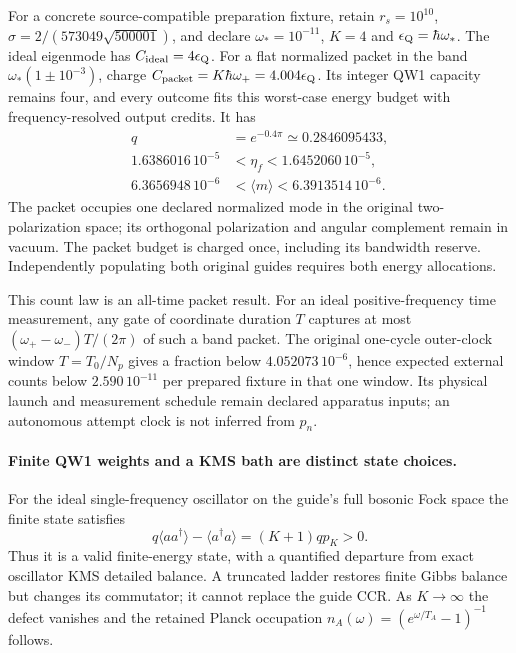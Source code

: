 \documentclass[10pt,twocolumn,letterpaper]{article}
\renewcommand{\hbar}{\mathchar'26\mkern-9mu h}
\begin{document}
For a concrete source-compatible preparation fixture, retain $r_s=10^{10}$,
$\sigma=2/(573049\sqrt{500001})$, and declare
$\omega_*=10^{-11}$, $K=4$ and $\epsilon_{\rm Q}=\hbar\omega_*$.
The ideal eigenmode has $C_{\rm ideal}=4\epsilon_{\rm Q}$.
For a flat normalized packet in the band $\omega_*(1\pm10^{-3})$,
charge $C_{\rm packet}=K\hbar\omega_+=4.004\epsilon_{\rm Q}$. Its
integer QW1 capacity remains four, and every outcome fits this worst-case
energy budget with frequency-resolved output credits. It has
\[
 \begin{split}
 q&=e^{-0.4\pi}\simeq0.2846095433,\\
 1.6386016\,10^{-5}&<\eta_f<1.6452060\,10^{-5},\\
 6.3656948\,10^{-6}&<\langle m\rangle<6.3913514\,10^{-6}.
 \end{split}
\]
The packet occupies one declared normalized mode in the original
two-polarization space; its orthogonal polarization and angular complement
remain in vacuum. The packet budget is charged once, including its bandwidth reserve. Independently populating
both original guides requires both energy allocations.

This count law is an all-time packet result. For an ideal positive-frequency
time measurement, any gate of coordinate duration $T$ captures at most
$(\omega_+-\omega_-)T/(2\pi)$ of such a band packet. The original one-cycle
outer-clock window $T=T_0/N_p$ gives a fraction below
$4.052073\,10^{-6}$, hence expected external counts below
$2.590\,10^{-11}$ per prepared fixture in that one window.
Its physical launch and measurement schedule remain declared apparatus
inputs; an autonomous attempt clock is not inferred from $p_n$.

\paragraph{Finite QW1 weights and a KMS bath are distinct state choices.}
For the ideal single-frequency oscillator on the guide's full bosonic Fock
space the finite state satisfies
\[
 q\langle aa^\dagger\rangle-\langle a^\dagger a\rangle
                 =(K+1)q p_K>0.
\]
Thus it is a valid finite-energy state, with a quantified departure from
exact oscillator KMS detailed balance. A truncated ladder restores finite
Gibbs balance but changes its commutator; it cannot replace the guide CCR.
As $K\to\infty$ the defect vanishes and the retained Planck occupation
$n_A(\omega)=(e^{\omega/T_A}-1)^{-1}$ follows.
\end{document}
